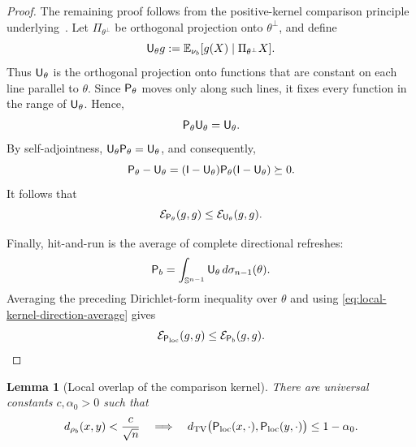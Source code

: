 \documentclass[11pt]{article}
\newtheorem{lemma}[theorem]{Lemma}
\theoremstyle{definition}
\theoremstyle{remark}
\newcommand{\E}{\mathbb E}
\newcommand{\dtv}{d_{\mathrm{TV}}}
\newcommand{\Id}{\mathsf I}
\begin{document}
\begin{proof}
The remaining proof follows from the positive-kernel comparison principle underlying~\cite[Lemma~8]{RudolfUllrichComparison}. Let $\Pi_{\theta^\perp}$ be orthogonal projection onto $\theta^\perp$, and define
\[
 {\sf U}_\theta g
 :=
 \E_{\nu_b}[g(X)\mid\Pi_{\theta^\perp} X].
\]
Thus ${\sf U}_\theta$ is the orthogonal projection onto functions that
are constant on each line parallel to $\theta$.  Since
${\sf P}_\theta$ moves only along such lines, it fixes every function
in the range of ${\sf U}_\theta$.  Hence,
\[
 {\sf P}_\theta{\sf U}_\theta={\sf U}_\theta.
\]
By self-adjointness, ${\sf U}_\theta{\sf P}_\theta={\sf U}_\theta$,  and consequently,
\begin{equation}\label{eq:directional-operator-order}
 {\sf P}_\theta-{\sf U}_\theta
 =
 (\Id-{\sf U}_\theta)
 {\sf P}_\theta
 (\Id-{\sf U}_\theta)
 \succeq0.
\end{equation}
It follows that
\[
 \mathcal E_{{\sf P}_\theta}(g,g)
 \le
 \mathcal E_{{\sf U}_\theta}(g,g).
\]


Finally, hit-and-run is the average of complete directional refreshes:
\[
 {\sf P}_b
 =
 \int_{\mathbb S^{n-1}}
 {\sf U}_\theta\,d\sigma_{n-1}(\theta).
\]
Averaging the preceding Dirichlet-form inequality over $\theta$ and
using \eqref{eq:local-kernel-direction-average} gives
\[
 \mathcal E_{{\sf P}_{\rm loc}}(g,g)
 \le
 \mathcal E_{{\sf P}_b}(g,g).
\]
\end{proof}

\begin{lemma}[Local overlap of the comparison kernel]
\label{lem:log-affine-local-overlap}
There are universal constants $c,\alpha_0>0$ such that
\begin{equation}\label{eq:log-affine-local-overlap}
 d_{\rho_b}(x,y)<\frac{c}{\sqrt n}
 \quad\Longrightarrow\quad
 \dtv\bigl({\sf P}_{\rm loc}(x,\cdot),{\sf P}_{\rm loc}(y,\cdot)\bigr)
 \le1-\alpha_0.
\end{equation}
\end{lemma}
\end{document}
